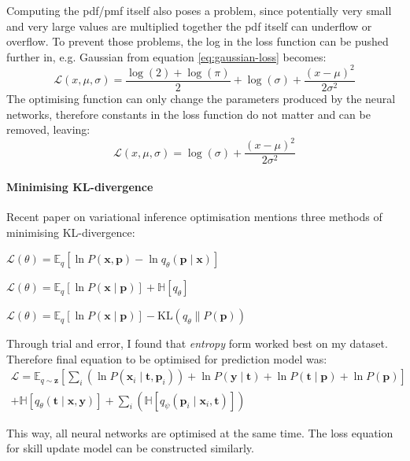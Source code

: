 \documentclass[12pt,a4paper]{book}
\newcommand\bs[1]{\boldsymbol{#1}}
\begin{document}
Computing the pdf/pmf itself also poses a problem, since potentially very small and very large values are multiplied together the pdf itself can underflow or overflow.
To prevent those problems, the log in the loss function can be pushed further in, e.g. Gaussian from equation \ref{eq:gaussian-loss} becomes:
\begin{equation*}
\mathcal{L}(x,\mu,\sigma) = \frac{\log(2)+\log(\pi)}{2}+\log(\sigma)+\frac{(x-\mu)^2}{2\sigma^2}
\end{equation*}
The optimising function can only change the parameters produced by the neural networks, therefore constants in the loss function do not matter and can be removed, leaving:
\begin{equation}
\mathcal{L}(x,\mu,\sigma) = \log(\sigma)+\frac{(x-\mu)^2}{2\sigma^2}
\label{eq:gaussian-log-loss}
\end{equation}

\paragraph{Minimising KL-divergence}
Recent paper on variational inference optimisation \cite{variationalmethods} mentions three methods of minimising KL-divergence:
\begin{description}[labelwidth=\widthof{\bfseries Entropy form }]
\item[Full MC form] $\mathcal{L}(\theta) = \mathbb{E}_{q}[\ln P(\bs{x},\bs{p}) - \ln q_\theta(\bs{p}\mid\bs{x})]$
\item[Entropy form] $\mathcal{L}(\theta) = \mathbb{E}_{q}[\ln P(\bs{x}\mid\bs{p})] + \mathbb{H}[q_\theta]$
\item[KL form] $\mathcal{L}(\theta) = \mathbb{E}_{q}[\ln P(\bs{x}\mid\bs{p})] - \text{KL}(q_\theta \parallel P(\bs{p}))$
\end{description}
Through trial and error, I found that \emph{entropy} form worked best on my dataset.
Therefore final equation to be optimised for prediction model was:
\begin{multline*}
\mathcal{L} = \mathbb{E}_{q\sim\bs{z}}\left[\sum_i(\ln P(\bs{x}_i\mid\bs{t},\bs{p}_i))+\ln P(\bs{y}\mid\bs{t})+\ln P(\bs{t}\mid\bs{p})+\ln P(\bs{p})\right] \\
+\mathbb{H}[q_\theta(\bs{t}\mid\bs{x},\bs{y})] + \sum_i\left(\mathbb{H}[q_\psi(\bs{p}_i\mid\bs{x}_i,\bs{t})]\right)
\end{multline*}

This way, all neural networks are optimised at the same time.
The loss equation for skill update model can be constructed similarly.
\end{document}
